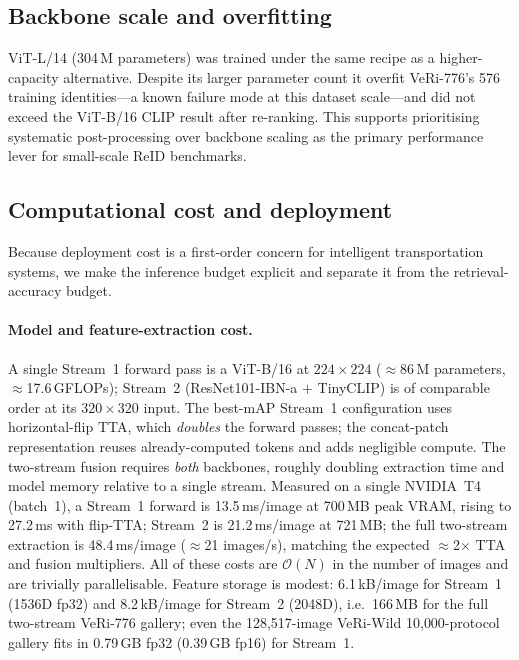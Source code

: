 \documentclass[10pt,a4paper]{article}
\begin{document}
\subsection{Backbone scale and overfitting}
ViT-L/14 (304\,M parameters) was trained under the same recipe as a
higher-capacity alternative. Despite its larger parameter count it overfit
VeRi-776's 576 training identities---a known failure mode at this dataset
scale---and did not exceed the ViT-B/16 CLIP result after re-ranking. This
supports prioritising systematic post-processing over backbone scaling as the
primary performance lever for small-scale ReID benchmarks.

\subsection{Computational cost and deployment}
\label{sec:cost}
Because deployment cost is a first-order concern for intelligent transportation
systems, we make the inference budget explicit and separate it from the
retrieval-accuracy budget.

\paragraph{Model and feature-extraction cost.} A single Stream~1 forward pass
is a ViT-B/16 at $224\times224$ ($\approx$86\,M parameters,
$\approx$17.6\,GFLOPs); Stream~2 (ResNet101-IBN-a $+$ TinyCLIP) is of
comparable order at its $320\times320$ input. The best-mAP Stream~1
configuration uses horizontal-flip TTA, which \emph{doubles} the forward
passes; the concat-patch representation reuses already-computed tokens and adds
negligible compute. The two-stream fusion requires \emph{both} backbones,
roughly doubling extraction time and model memory relative to a single stream.
Measured on a single NVIDIA~T4 (batch~1), a Stream~1 forward is 13.5\,ms/image
at 700\,MB peak VRAM, rising to 27.2\,ms with flip-TTA; Stream~2 is
21.2\,ms/image at 721\,MB; the full two-stream extraction is 48.4\,ms/image
($\approx$21 images/s), matching the expected $\approx$2$\times$ TTA and fusion
multipliers. All of these costs are $\mathcal{O}(N)$ in the number of images
and are trivially parallelisable. Feature storage is modest: 6.1\,kB/image for
Stream~1 (1536D fp32) and 8.2\,kB/image for Stream~2 (2048D), i.e.\ 166\,MB for
the full two-stream VeRi-776 gallery; even the 128{,}517-image VeRi-Wild
10{,}000-protocol gallery fits in 0.79\,GB fp32 (0.39\,GB fp16) for Stream~1.
\end{document}
